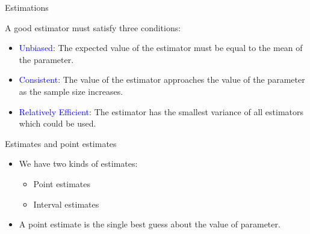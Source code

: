 \documentclass{beamer}
\begin{document}
\begin{frame}
{\centerline{Estimations}}

A good estimator must satisfy three conditions:
\begin{itemize}
\item \textcolor{blue}{Unbiased}: The expected value of the estimator must be equal to the mean of the parameter.
\item \textcolor{blue}{Consistent}: The value of the estimator approaches the value of the parameter as the sample size increases.
\item \textcolor{blue}{Relatively Efficient}: The estimator has the smallest variance of all estimators which could be used.
\end{itemize}
\end{frame}


\begin{frame}
{\centerline{Estimates and point estimates}}


\begin{itemize}
\item We have two kinds of estimates:
\begin{itemize}
\item Point estimates
\item Interval estimates
\end{itemize}
\item A point estimate is the single best guess about the value of parameter.
\end{itemize}

\end{frame}




\end{document}

